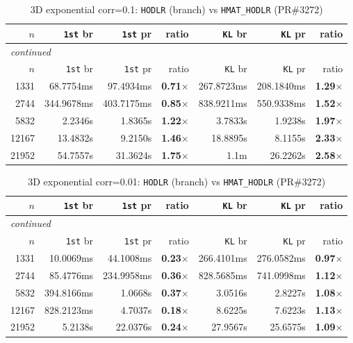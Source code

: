 \documentclass[11pt,a4paper]{article}
\begin{document}
\small\begin{center}
\begin{longtable}{rrrrrrr}
\caption{3D exponential corr=0.1: \texttt{HODLR} (branch) vs \texttt{HMAT\_HODLR} (PR\#3272)}
\\\toprule
$n$ & \texttt{1st} br & \texttt{1st} pr & ratio & \texttt{KL} br & \texttt{KL} pr & ratio\\
\midrule
\endfirsthead
\multicolumn{7}{l}{\small\emph{continued}}\\
\toprule
$n$ & \texttt{1st} br & \texttt{1st} pr & ratio & \texttt{KL} br & \texttt{KL} pr & ratio\\
\midrule
\endhead

1331 & 68.7754ms & 97.4934ms & \textbf{0.71$\times$} & 267.8723ms & 208.1840ms & \textbf{1.29$\times$}\\
2744 & 344.9678ms & 403.7175ms & \textbf{0.85$\times$} & 838.9211ms & 550.9338ms & \textbf{1.52$\times$}\\
5832 & 2.2346s & 1.8365s & \textbf{1.22$\times$} & 3.7833s & 1.9238s & \textbf{1.97$\times$}\\
12167 & 13.4832s & 9.2150s & \textbf{1.46$\times$} & 18.8895s & 8.1155s & \textbf{2.33$\times$}\\
21952 & 54.7557s & 31.3624s & \textbf{1.75$\times$} & 1.1m & 26.2262s & \textbf{2.58$\times$}\\
\bottomrule\end{longtable}\end{center}
\small\begin{center}
\begin{longtable}{rrrrrrr}
\caption{3D exponential corr=0.01: \texttt{HODLR} (branch) vs \texttt{HMAT\_HODLR} (PR\#3272)}
\\\toprule
$n$ & \texttt{1st} br & \texttt{1st} pr & ratio & \texttt{KL} br & \texttt{KL} pr & ratio\\
\midrule
\endfirsthead
\multicolumn{7}{l}{\small\emph{continued}}\\
\toprule
$n$ & \texttt{1st} br & \texttt{1st} pr & ratio & \texttt{KL} br & \texttt{KL} pr & ratio\\
\midrule
\endhead

1331 & 10.0069ms & 44.1008ms & \textbf{0.23$\times$} & 266.4101ms & 276.0582ms & \textbf{0.97$\times$}\\
2744 & 85.4776ms & 234.9958ms & \textbf{0.36$\times$} & 828.5685ms & 741.0998ms & \textbf{1.12$\times$}\\
5832 & 394.8166ms & 1.0668s & \textbf{0.37$\times$} & 3.0516s & 2.8227s & \textbf{1.08$\times$}\\
12167 & 828.2123ms & 4.7037s & \textbf{0.18$\times$} & 8.6225s & 7.6223s & \textbf{1.13$\times$}\\
21952 & 5.2138s & 22.0376s & \textbf{0.24$\times$} & 27.9567s & 25.6575s & \textbf{1.09$\times$}\\
\bottomrule\end{longtable}\end{center}
\end{document}
